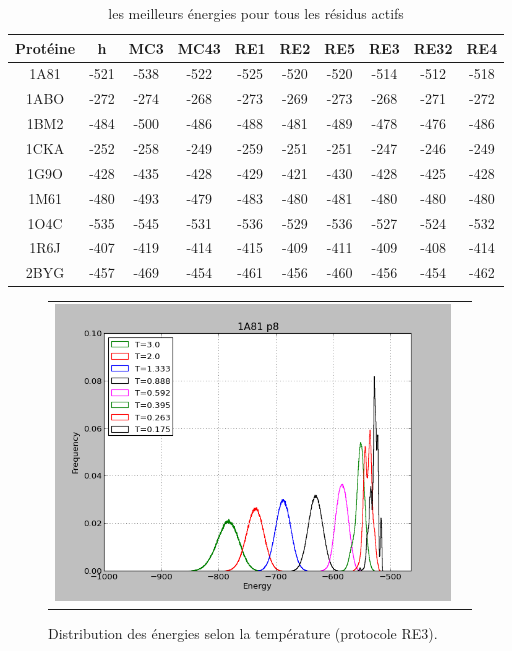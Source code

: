 \documentclass[a4paper,12pt]{article}
\begin{document}
    \begin{table}[!htbp]
      \centering

      \begin{tabular}{|c|c|c|c|c|c|c|c|c|c|}

        \hline
        Protéine & h & MC3 & MC43 & RE1 & RE2 & RE5 & RE3 & RE32 & RE4 \\
        \hline
        1A81 & -521 & -538 & -522 & -525 & -520 & -520 & -514 & -512 & -518 \\
        1ABO & -272 & -274 & -268 & -273 & -269 & -273 & -268 & -271 & -272 \\
        1BM2 & -484 & -500 & -486 & -488 & -481 & -489 & -478 & -476 & -486 \\
        1CKA & -252 & -258 & -249 & -259 & -251 & -251 & -247 & -246 & -249 \\
        1G9O & -428 & -435 & -428 & -429 & -421 & -430 & -428 & -425 & -428 \\
        1M61 & -480 & -493 & -479 & -483 & -480 & -481 & -480 & -480 & -480 \\
        1O4C & -535 & -545 & -531 & -536 & -529 & -536 & -527 & -524 & -532 \\
        1R6J & -407 & -419 & -414 & -415 & -409 & -411 & -409 & -408 & -414 \\
        2BYG & -457 & -469 & -454 & -461 & -456 & -460 & -456 & -454 & -462 \\
        
        \hline

      \end{tabular}      
      \caption{les meilleurs énergies pour tous les résidus actifs}
      \label{tab_best_ener_all}      
    \end{table}


   \begin{figure}[t]
     \centering
     \begin{tabular}{cc}
       \includegraphics[width=12cm]{image/1A81_casa-p8.png} &
     \end{tabular}
     
     \caption{Distribution des énergies selon la température (protocole RE3).}
     \label{Distrib_E_RE3}
   \end{figure}
\end{document}
